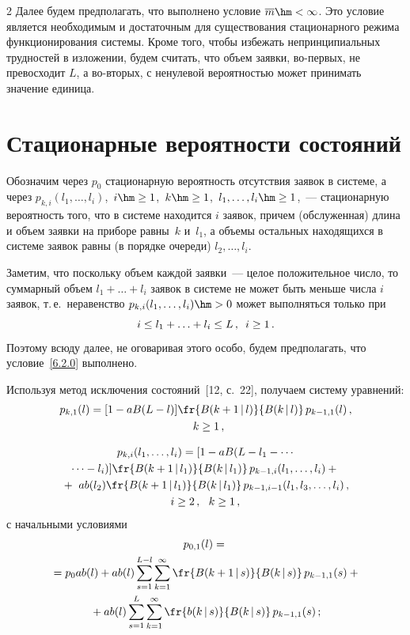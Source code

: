 \begin{multicols}{2}
Далее будем предполагать, что выполнено условие
$\overline m \hm< \infty$.
Это условие является необходимым и достаточным для
существования стационарного режима функционирования
сис\-те\-мы. Кроме того, чтобы избежать непринципиальных
трудностей в изложении, будем считать, что объем заявки,
во-пер\-вых, не превосходит $L$, а во-вто\-рых, с ненулевой
вероятностью может принимать значение единица.

\section{Стационарные вероятности состояний}

Обозначим через $p_0$ стационарную вероятность
отсутствия заявок в сис\-те\-ме, а через
$p_{k,i}(l_1,\ldots,l_i)$,\ 
$i \hm\ge 1$,\  $k\hm\ge 1$,\  $l_1,\ldots,l_i \hm\ge 1$,~---
стационарную вероятность того, что в сис\-те\-ме находится
$i$ заявок, причем (обслуженная) длина и объем заявки
на приборе равны~$k$ и~$l_1$, а объемы остальных
находящихся в сис\-те\-ме заявок равны (в порядке очереди)
$l_2,\ldots,l_i$.

Заметим, что поскольку объем каждой заявки~---
целое положительное чис\-ло, то
суммарный объем $l_1 +\ldots+ l_i$ заявок в системе
не может быть меньше числа $i$ заявок, т.\,е.\
неравенство $p_{k,i}(l_1,\ldots,l_i) \hm> 0$
может выполняться только при
\begin{equation}
\label{6.2.0}
i\le l_1 +\ldots+ l_i \le L
\,,\enskip i \ge 1\,.
\end{equation}
Поэтому всюду далее, не оговаривая этого особо, будем
предполагать, что условие~\eqref{6.2.0} выполнено.

Используя метод исключения состояний~[12, с.~22],
получаем сис\-те\-му урав\-нений:
\begin{multline}
\label{6.2.1}
p_{k,1}(l)
=
[1 - a B(L-l)]
\fr{B(k+1\,|\,l)}{B(k\,|\,l)}
\,p_{k-1,1}(l)\,,\\
\enskip k\ge 1\,,
\end{multline}

\vspace*{-9pt}

\noindent
\begin{multline}
p_{k,i}(l_1,\ldots,l_i)
=
[1 - a B(L-l_1-\cdots\\
\cdots -l_i)]
\fr{B(k+1\,|\,l_1)}{B(k\,|\,l_1)}
\,p_{k-1,i}(l_1,\ldots,l_i)
 +{}\\
{}
+\
a b(l_2)
\fr{B(k+1\,|\,l_1)}{ B(k\,|\,l_1)}
\,p_{k-1,i-1}(l_1,l_3,\ldots,l_i)\,,
\\
i \ge 2\,,\ \  k\ge 1\,,
\label{6.2.2}
\end{multline}
с начальными условиями
\begin{multline}
\label{6.2.3}
p_{0,1}(l)
={}\\
{}=p_0 a b(l)
+a b(l)\sum\limits_{s=1}^{L-l}
\sum\limits_{k=1}^\infty
\fr{B(k+1\,|\,s) }{B(k\,|\,s)}\, p_{k-1,1}(s)
+{}\\
{}+
a b(l)
\sum\limits_{s=1}^{L}
\sum\limits_{k=1}^\infty
\fr{b(k\,|\,s)}{ B(k\,|\,s)}\, p_{k-1,1}(s)\,;
\end{multline}


\end{multicols}
